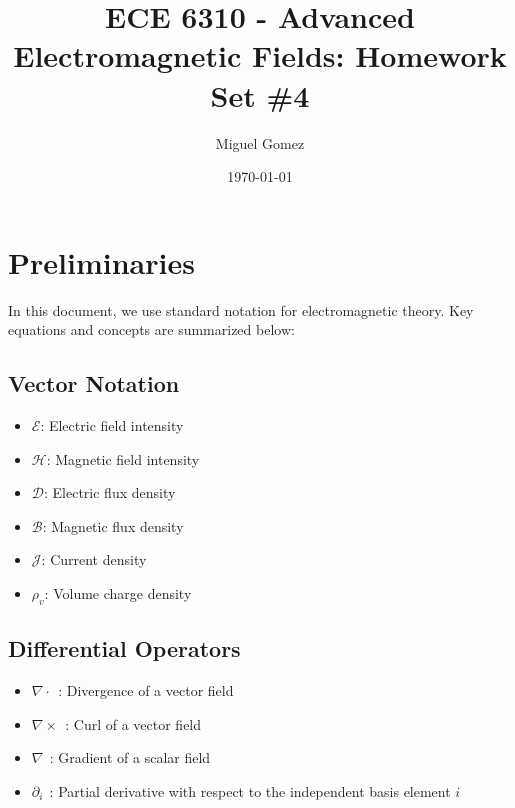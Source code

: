 \documentclass[12pt]{article}
\newcommand{\TimeUntilDue}{
  \ifnum\daystilldue<4
    \textcolor{red}{
    \number\daystilldue\ days - 
    \number\hourstilldue\ hours - 
    \number\minutestilldue\ min until deadline!!
  }
\else
    \number\daystilldue\ days - 
    \number\hourstilldue\ hours - 
    \number\minutestilldue\ min until deadline
  \fi
}
\begin{document}
\newcommand{\Cross}[2]{
\hat a_x(#1_2#2_3 -#1_3#2_2) -\hat a_y(#1_1#2_3-#1_3#2_1) + \hat a_z(#1_1#2_2-#1_2#2_1) 
}
\title{ECE 6310 - Advanced Electromagnetic Fields: Homework Set \#4}
\author{Miguel Gomez}
\date{\today}
\maketitle

\section*{Preliminaries}
In this document, we use standard notation for electromagnetic theory. Key equations and concepts are summarized below:

\subsection*{Vector Notation}
\begin{itemize}
  \item $\bm{\mathcal{E}}$: Electric field intensity
  \item $\bm{\mathcal{H}}$: Magnetic field intensity
  \item $\bm{\mathcal{D}}$: Electric flux density
  \item $\bm{\mathcal{B}}$: Magnetic flux density
  \item $\bm{\mathcal{J}}$: Current density
  \item $\rho_v$: Volume charge density
\end{itemize}

\subsection*{Differential Operators}
\begin{itemize}
  \item $\nabla \cdot\ \ $: Divergence of a vector field
  \item $\nabla \times\ \ $: Curl of a vector field
  \item $\nabla\ \ $: Gradient of a scalar field
  \item $\partial_i\ \ $: Partial derivative with respect to the independent basis element $i$
\end{itemize}
\end{document}
